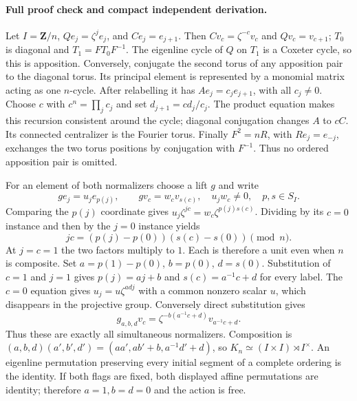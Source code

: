 \paragraph{Full proof check and compact independent derivation.}
Let $I=\mathbf Z/n$, $Qe_j=\zeta^je_j$, and
$Ce_j=e_{j+1}$.  Then $Cv_c=\zeta^{-c}v_c$ and
$Qv_c=v_{c+1}$; $T_0$ is diagonal and $T_1=FT_0F^{-1}$.
The eigenline cycle of $Q$ on $T_1$ is a Coxeter cycle, so this is
apposition.  Conversely, conjugate the second torus of any apposition
pair to the diagonal torus.  Its principal element is represented by
a monomial matrix acting as one $n$-cycle.  After relabelling it has
$Ae_j=c_je_{j+1}$, with all $c_j\ne0$.  Choose $c$ with
$c^n=\prod_jc_j$ and set $d_{j+1}=cd_j/c_j$.  The product equation
makes this recursion consistent around the cycle; diagonal
conjugation changes $A$ to $cC$.  Its connected centralizer is the
Fourier torus.  Finally $F^2=nR$, with $Re_j=e_{-j}$, exchanges the
two torus positions by conjugation with $F^{-1}$.  Thus no ordered
apposition pair is omitted.

For an element of both normalizers choose a lift $g$ and write
\[
 ge_j=u_je_{p(j)},\qquad gv_c=w_cv_{s(c)},
 \quad u_jw_c\ne0,\quad p,s\in S_I.
\]
Comparing the $p(j)$ coordinate gives
$u_j\zeta^{jc}=w_c\zeta^{p(j)s(c)}$.  Dividing by its $c=0$
instance and then by the $j=0$ instance yields
\[
 jc=(p(j)-p(0))(s(c)-s(0))\pmod n.
\]
At $j=c=1$ the two factors multiply to $1$.  Each is therefore a
unit even when $n$ is composite.  Set $a=p(1)-p(0)$,
$b=p(0)$, $d=s(0)$.  Substitution of $c=1$ and $j=1$ gives
$p(j)=aj+b$ and $s(c)=a^{-1}c+d$ for every label.  The $c=0$
equation gives $u_j=u\zeta^{ad j}$ with a common nonzero scalar
$u$, which disappears in the projective group.  Conversely direct
substitution gives
\[
 g_{a,b,d}v_c=\zeta^{-b(a^{-1}c+d)}v_{a^{-1}c+d}.
\]
Thus these are exactly all simultaneous normalizers.  Composition is
$(a,b,d)(a',b',d')=(aa',ab'+b,a^{-1}d'+d)$, so
$K_n\simeq(I\times I)\rtimes I^\times$.  An eigenline permutation
preserving every initial segment of a complete ordering is the
identity.  If both flags are fixed, both displayed affine
permutations are identity; therefore $a=1,b=d=0$ and the action is
free.

